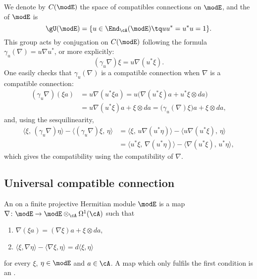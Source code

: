 We denote by $C(\modE)$ the space of compatibles connections on $\modE$, and the  of $\modE$ is
\[
	\gU(\modE)=\{ u\in\End_{\cA}(\modE)\tq uu^*=u^*u=1 \}.
\]
This group acts by conjugation on $C(\modE)$ following the formula $\gamma_u(\nabla)=u\nabla u^*$, or more explicitly:
\begin{equation}
	(\gamma_u\nabla)\xi=u\nabla(u^*\xi).
\end{equation}
One easily checks that $\gamma_u(\nabla)$ is a compatible connection when $\nabla$ is a compatible connection:
\[
	\begin{split}
		(\gamma_u\nabla)(\xi a)&=u\nabla(u^*\xi a)=u\big( \nabla(u^*\xi)a+u^*\xi\otimes da \big)\\
		&=u\nabla(u^*\xi)a+\xi\otimes da=\big( \gamma_u(\nabla)\xi \big)a+\xi\otimes da,
	\end{split}
\]
and, using the sesquilinearity,
\[
	\begin{split}
		\langle \xi,\,(\gamma_u\nabla)\eta\rangle-\langle (\gamma_u\nabla)\xi,\,\eta\rangle&=\langle \xi,\,u\nabla(u^*\eta)\rangle-\langle u\nabla(u^*\xi),\,\eta\rangle\\
		&=\langle u^*\xi,\,\nabla(u^*\eta)\rangle-\langle \nabla(u^*\xi),\,u^*\eta\rangle,
	\end{split}
\]
which gives the compatibility using the compatibility of  $\nabla$.

\subsection{Universal compatible connection}

An  on a finite projective Hermitian module $\modE$ is a map $\nabla\colon \modE\to \modE\otimes_{\cA}\Omega^1(\cA)$ such that
\begin{enumerate}
	\item $\nabla(\xi a)=(\nabla \xi)a+\xi\otimes da$,
	\item $\langle \xi, \nabla\eta\rangle -\langle \nabla\xi, \eta\rangle =d\langle \xi, \eta\rangle$
\end{enumerate}
for every $\xi$, $\eta\in\modE$ and $a\in\cA$. A map which only fulfils the first condition is an .

